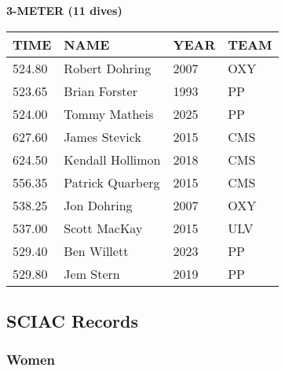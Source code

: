 \vspace{0.4cm}

\begin{center}
\begin{minipage}[t]{0.7\textwidth}
\centering
\textbf{3-METER (11 dives)}\\[0.05cm]
\begin{tabular}{@{}p{1.8cm}p{2.8cm}p{1.2cm}p{1.4cm}@{}}
\hline
\textbf{TIME} & \textbf{NAME} & \textbf{YEAR} & \textbf{TEAM} \\
\hline
524.80 & Robert Dohring & 2007 & OXY \\
523.65 & Brian Forster & 1993 & PP \\
524.00 & Tommy Matheis & 2025 & PP \\
627.60 & James Stevick & 2015 & CMS \\
624.50 & Kendall Hollimon & 2018 & CMS \\
556.35 & Patrick Quarberg & 2015 & CMS \\
538.25 & Jon Dohring & 2007 & OXY \\
537.00 & Scott MacKay & 2015 & ULV \\
529.40 & Ben Willett & 2023 & PP \\
529.80 & Jem Stern & 2019 & PP \\
\hline
\end{tabular}
\end{minipage}
\end{center}

\vspace{0.4cm}

\newpage

\subsection{SCIAC Records}
\subsubsection{Women}

